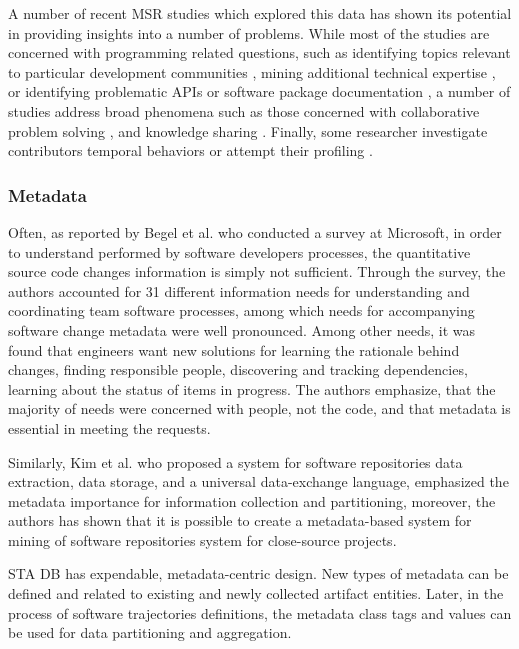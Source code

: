 A number of recent MSR studies which explored this data has shown its potential in providing insights into a number of problems.
While most of the studies are concerned with programming related questions, such as identifying topics relevant to particular 
development communities \cite{kartik:msr14}, mining additional technical expertise \cite{VenkataramaniGAMB13} \cite{SaxeMG13}, 
or identifying problematic APIs \cite{KavalerPGCDF13} \cite{Linares2013Exploratory} or software package documentation 
\cite{Campbell2013Deficient}, 
a number of studies address broad phenomena such as those concerned with collaborative problem solving 
\cite{Tausczik2014Collaborative}, and knowledge sharing \cite{VasilescuCSCW14} \cite{Schenk2013Geo}. 
Finally, some researcher investigate contributors temporal behaviors \cite{Bosu2013Building} or attempt their profiling 
\cite{GinscaP13}.

\subsubsection{Metadata}
Often, as reported by Begel
et al. \cite{citeulike:7260421} who conducted a survey at Microsoft, in order to understand performed 
by software developers processes, the quantitative source code changes information is simply not sufficient. Through the survey,
the authors accounted for 31 different information needs for understanding and coordinating team software processes, among 
which needs for accompanying software change metadata were well pronounced. Among other needs, it was found that engineers 
want new solutions for
learning the rationale behind
changes, finding responsible people, discovering and tracking dependencies, 
learning
about the status of items in progress. The authors emphasize, that the majority of needs were concerned with people, not 
the code, and that metadata is essential in meeting the requests.

Similarly, Kim et al. \cite{citeulike:4000311} who proposed a system for software repositories data extraction, data storage, 
and a universal data-exchange language, emphasized the metadata importance for information collection and partitioning, moreover, 
the authors has shown that it is possible to create a metadata-based system for mining of software repositories system for 
close-source projects.

STA DB has expendable, metadata-centric design. New types of metadata can be defined and related to existing and newly collected
artifact entities. Later, in the process of software trajectories definitions, the metadata class tags and values can be used 
for data partitioning and aggregation.

